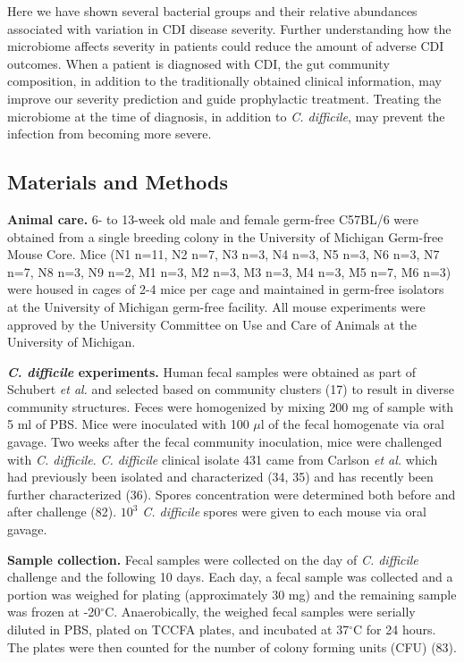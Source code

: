 \documentclass[
  12pt,
]{article}
\begin{document}
Here we have shown several bacterial groups and their relative
abundances associated with variation in CDI disease severity. Further
understanding how the microbiome affects severity in patients could
reduce the amount of adverse CDI outcomes. When a patient is diagnosed
with CDI, the gut community composition, in addition to the
traditionally obtained clinical information, may improve our severity
prediction and guide prophylactic treatment. Treating the microbiome at
the time of diagnosis, in addition to \emph{C. difficile}, may prevent
the infection from becoming more severe.

\hypertarget{materials-and-methods}{%
\subsection{Materials and Methods}\label{materials-and-methods}}

\textbf{Animal care.} 6- to 13-week old male and female germ-free
C57BL/6 were obtained from a single breeding colony in the University of
Michigan Germ-free Mouse Core. Mice (N1 n=11, N2 n=7, N3 n=3, N4 n=3, N5
n=3, N6 n=3, N7 n=7, N8 n=3, N9 n=2, M1 n=3, M2 n=3, M3 n=3, M4 n=3, M5
n=7, M6 n=3) were housed in cages of 2-4 mice per cage and maintained in
germ-free isolators at the University of Michigan germ-free facility.
All mouse experiments were approved by the University Committee on Use
and Care of Animals at the University of Michigan.

\textbf{\emph{C. difficile} experiments.} Human fecal samples were
obtained as part of Schubert \emph{et al.} and selected based on
community clusters (17) to result in diverse community structures. Feces
were homogenized by mixing 200 mg of sample with 5 ml of PBS. Mice were
inoculated with 100 \(\mu\)l of the fecal homogenate via oral gavage.
Two weeks after the fecal community inoculation, mice were challenged
with \emph{C. difficile}. \emph{C. difficile} clinical isolate 431 came
from Carlson \emph{et al.} which had previously been isolated and
characterized (34, 35) and has recently been further characterized (36).
Spores concentration were determined both before and after challenge
(82). \(10^{3}\) \emph{C. difficile} spores were given to each mouse via
oral gavage.

\textbf{Sample collection.} Fecal samples were collected on the day of
\emph{C. difficile} challenge and the following 10 days. Each day, a
fecal sample was collected and a portion was weighed for plating
(approximately 30 mg) and the remaining sample was frozen at
-20\(^\circ\)C. Anaerobically, the weighed fecal samples were serially
diluted in PBS, plated on TCCFA plates, and incubated at 37\(^\circ\)C
for 24 hours. The plates were then counted for the number of colony
forming units (CFU) (83).
\end{document}
